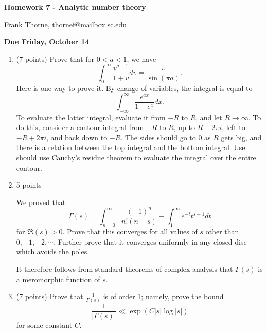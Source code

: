 \documentclass[12pt]{article}
\begin{document}
\setlength{\topmargin}{-2mm}





\begin{center}{\bf Homework 7 - Analytic number theory}
\end{center}
\begin{center}Frank Thorne, thornef@mailbox.sc.edu
\end{center}
\begin{center}
{\bf Due Friday, October 14}
\end{center}
\begin{enumerate}
\item(7 points)
Prove that for $0 < a < 1$, we have
\begin{equation}
\int_0^{\infty} \frac{v^{a - 1}}{1 + v} dv = \frac{\pi}{\sin(\pi a)}.
\end{equation}
Here is one way to prove it. By change of variables, the integral is equal to
\begin{equation}
\int_{-\infty}^{\infty} \frac{e^{ax}}{1 + e^x} dx.
\end{equation}
To evaluate the latter integral, evaluate it from $-R$ to $R$, and let $R \rightarrow \infty$.
To do this, consider a contour integral from $-R$ to $R$, up to $R + 2\pi i$, left
to $-R + 2 \pi i$, and back down to $-R$. The sides should go to 0 as $R$ gets big, and
there is a relation between the top integral and the bottom integral. Use should
use Cauchy's residue theorem to evaluate the integral over the entire contour.

\item{5 points}

We proved that
\begin{equation}
\Gamma(s) = \int_{n = 0}^{\infty} \frac{(-1)^n}{n! (n + s)} 
+ \int_1^{\infty} e^{-t} t^{s - 1} dt
\end{equation}
for $\Re(s) > 0$. Prove that this converges for all values of $s$
other than $0, -1, -2, \cdots$. Further prove that it converges uniformly
in any closed disc which avoids the poles.

It therefore follows from standard theorems of complex analysis
that $\Gamma(s)$ is a meromorphic function of $s$.

\item(7 points)
Prove that $\frac{1}{\Gamma(s)}$ is of order 1; namely, prove the bound
\begin{equation}
\frac{1}{|\Gamma(s)|} \ll \exp(C |s| \log |s|)
\end{equation}
for some constant $C$. 


\end{enumerate}
\end{document}

